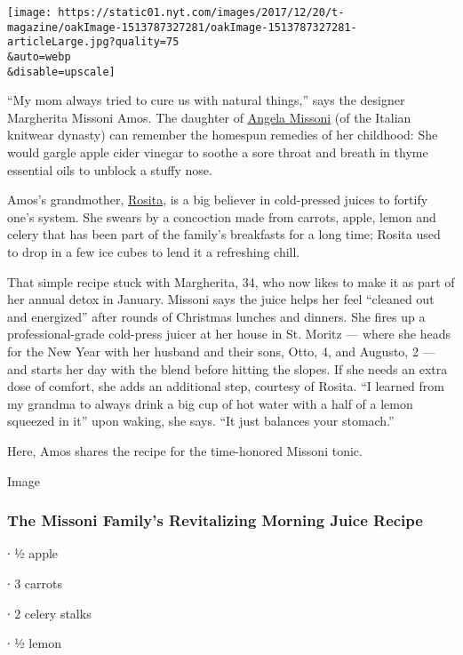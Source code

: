 \texttt{[image: https://static01.nyt.com/images/2017/12/20/t-magazine/oakImage-1513787327281/oakImage-1513787327281-articleLarge.jpg?quality=75\\\&auto=webp\\\&disable=upscale]}

``My mom always tried to cure us with natural things,'' says the
designer Margherita Missoni Amos. The daughter of
\href{https://www.nytimes.com/2017/09/25/t-magazine/fashion/angela-missoni-milan-fashion-week.html}{Angela
Missoni} (of the Italian knitwear dynasty) can remember the homespun
remedies of her childhood: She would gargle apple cider vinegar to
soothe a sore throat and breath in thyme essential oils to unblock a
stuffy nose.

Amos's grandmother,
\href{https://www.nytimes.com/2017/07/11/t-magazine/rosita-missoni-garden-home.html}{Rosita},
is a big believer in cold-pressed juices to fortify one's system. She
swears by a concoction made from carrots, apple, lemon and celery that
has been part of the family's breakfasts for a long time; Rosita used to
drop in a few ice cubes to lend it a refreshing chill.

That simple recipe stuck with Margherita, 34, who now likes to make it
as part of her annual detox in January. Missoni says the juice helps her
feel ``cleaned out and energized'' after rounds of Christmas lunches and
dinners. She fires up a professional-grade cold-press juicer at her
house in St. Moritz --- where she heads for the New Year with her
husband and their sons, Otto, 4, and Augusto, 2 --- and starts her day
with the blend before hitting the slopes. If she needs an extra dose of
comfort, she adds an additional step, courtesy of Rosita. ``I learned
from my grandma to always drink a big cup of hot water with a half of a
lemon squeezed in it'' upon waking, she says. ``It just balances your
stomach.''

Here, Amos shares the recipe for the time-honored Missoni tonic.

Image

\hypertarget{the-missoni-familys-revitalizing-morning-juice-recipe}{%
\subsubsection{The Missoni Family's Revitalizing Morning Juice
Recipe}\label{the-missoni-familys-revitalizing-morning-juice-recipe}}

∙ ½ apple

∙ 3 carrots

∙ 2 celery stalks

∙ ½ lemon

